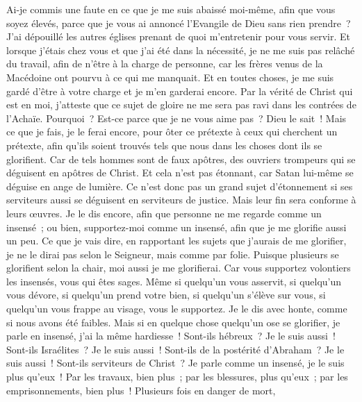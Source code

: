 \begin{multicols}{2}
Ai-je commis une faute en ce que je me suis abaissé moi-même, afin que vous soyez élevés, parce que je vous ai annoncé l'Evangile de Dieu sans rien prendre~?
J'ai dépouillé les autres églises prenant de quoi m'entretenir pour vous servir. Et lorsque j'étais chez vous et que j'ai été dans la nécessité, je ne me suis pas relâché du travail, afin de n'être à la charge de personne,
car les frères venus de la Macédoine ont pourvu à ce qui me manquait. Et en toutes choses, je me suis gardé d'être à votre charge et je m'en garderai encore.
Par la vérité de Christ qui est en moi, j'atteste que ce sujet de gloire ne me sera pas ravi dans les contrées de l'Achaïe.
Pourquoi~? Est-ce parce que je ne vous aime pas~? Dieu le sait~!
Mais ce que je fais, je le ferai encore, pour ôter ce prétexte à ceux qui cherchent un prétexte, afin qu'ils soient trouvés tels que nous dans les choses dont ils se glorifient.
Car de tels hommes sont de faux apôtres, des ouvriers trompeurs qui se déguisent en apôtres de Christ.
Et cela n'est pas étonnant, car Satan lui-même se déguise en ange de lumière.
Ce n'est donc pas un grand sujet d'étonnement si ses serviteurs aussi se déguisent en serviteurs de justice. Mais leur fin sera conforme à leurs œuvres.
Je le dis encore, afin que personne ne me regarde comme un insensé~; ou bien, supportez-moi comme un insensé, afin que je me glorifie aussi un peu.
Ce que je vais dire, en rapportant les sujets que j'aurais de me glorifier, je ne le dirai pas selon le Seigneur, mais comme par folie.
Puisque plusieurs se glorifient selon la chair, moi aussi je me glorifierai.
Car vous supportez volontiers les insensés, vous qui êtes sages.
Même si quelqu'un vous asservit, si quelqu'un vous dévore, si quelqu'un prend votre bien, si quelqu'un s'élève sur vous, si quelqu'un vous frappe au visage, vous le supportez.
Je le dis avec honte, comme si nous avons été faibles. Mais si en quelque chose quelqu'un ose se glorifier, je parle en insensé, j'ai la même hardiesse~!
Sont-ils hébreux~? Je le suis aussi~! Sont-ils Israélites~? Je le suis aussi~! Sont-ils de la postérité d'Abraham~? Je le suis aussi~!
Sont-ils serviteurs de Christ~? Je parle comme un insensé, je le suis plus qu'eux~! Par les travaux, bien plus~; par les blessures, plus qu'eux~; par les emprisonnements, bien plus~! Plusieurs fois en danger de mort,

\end{multicols}

